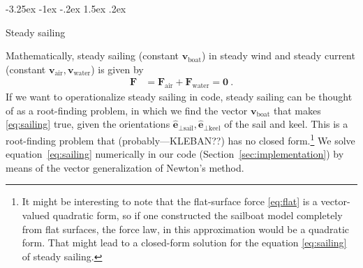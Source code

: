 \documentclass[letterpaper]{article}
\makeatletter
\renewcommand{\vec}[1]{\boldsymbol{#1}}
\newcommand{\uvec}{\vec{\hat{e}}}
\newcommand{\air}{\text{air}}
\newcommand{\water}{\text{water}}
\newcommand{\boat}{\text{boat}}
\newcommand{\sail}{\text{sail}}
\newcommand{\keel}{\text{keel}}
\newcommand{\vair}{\vec{v}_\air}
\newcommand{\vwater}{\vec{v}_\water}
\newcommand{\vboat}{\vec{v}_\boat}
\newcommand{\secref}[1]{Section~\ref{#1}}
\renewcommand\section{\@startsection {section}{1}{\z@}%
  {-3.25ex \@plus -1ex \@minus -.2ex}%
  {1.5ex \@plus .2ex}%
  {\raggedright\normalfont\large\bfseries}}
\makeatother
\begin{document}
\section{Steady sailing}\label{sec:steady}

Mathematically, steady sailing (constant $\vboat$) in steady wind and steady current (constant $\vair, \vwater$) is given by
\begin{align}\label{eq:sailing}
    \vec{F} &= \vec{F}_\air + \vec{F}_\water = \vec{0} ~.
\end{align} 
If we want to operationalize steady sailing in code, steady sailing can be thought of as a root-finding problem, in which we find the vector $\vboat$ that makes \eqref{eq:sailing} true, given the orientations $\uvec_{\perp\sail}, \uvec_{\perp\keel}$ of the sail and keel.
This is a root-finding problem that (probably---KLEBAN??) has no closed form.\footnote{%
It might be interesting to note that the flat-surface force \eqref{eq:flat} is a vector-valued quadratic form, so if one constructed the sailboat model completely from flat surfaces, the force law, in this approximation would be a quadratic form.
That might lead to a closed-form solution for the equation \eqref{eq:sailing} of steady sailing.}
We solve equation~\eqref{eq:sailing} numerically in our code (\secref{sec:implementation})
by means of the vector generalization of Newton's method.
\end{document}
